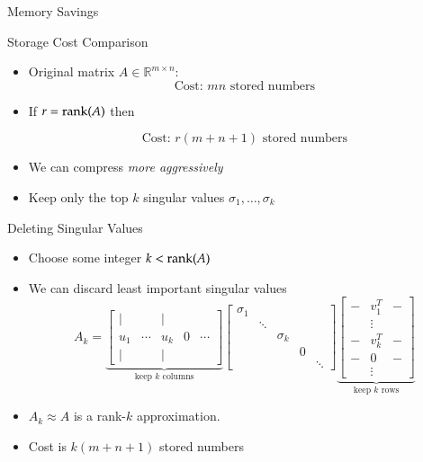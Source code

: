 \documentclass[10pt]{beamer}
\begin{document}
\begin{frame}{Memory Savings}

\begin{block}{Storage Cost Comparison}
\begin{itemize}
    \item Original matrix \( A \in \mathbb{R}^{m \times n} \):  
    \[
    \text{Cost: } mn \text{ stored numbers}
    \]
    \item If $r=\mathrm{rank}(A)$ then   

    \[
    \text{Cost: } r(m + n + 1) \text{ stored numbers}
    \]
\end{itemize}
\end{block}

\vspace{3mm}
\begin{itemize}
    \item We can compress \emph{more aggressively} 
    \item Keep only the top $k$ singular values $\sigma_1, \ldots, \sigma_k$
\end{itemize}
\end{frame}




\begin{frame}{Deleting Singular Values}
\begin{itemize}
    \item Choose some integer $k < \mathrm{rank}(A)$
    \item We can discard least important singular values 
\[
A_k =
\underbrace{
\begin{bmatrix}
    | &        & |  &    &         \\
    u_1 & \cdots & u_k & 0 & \cdots \\
    | &        & |  &    &         
\end{bmatrix}}_{\text{keep $k$ columns}}
\begin{bmatrix}
    \sigma_1 &          &          &        &         \\
             & \ddots   &          &        &         \\
             &          & \sigma_k &        &         \\
             &          &          & 0      &         \\
             &          &          &        & \ddots
\end{bmatrix}
\underbrace{
\begin{bmatrix}
    - & v_1^T & - \\
      & \vdots &   \\
    - & v_k^T & - \\
    - & 0     & - \\
      & \vdots &  
\end{bmatrix}}_{\text{keep $k$ rows}}
\]

\item $A_k\approx A$ is a rank-$k$ approximation.
\item Cost is   $k(m+n+1)$ stored numbers
\end{itemize}
\end{frame}
\end{document}
